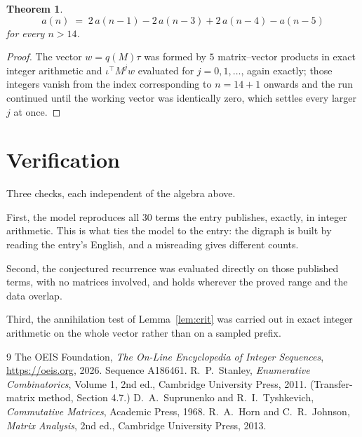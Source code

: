 \documentclass[11pt,a4paper]{article}
\theoremstyle{plain}
\newtheorem{theorem}{Theorem}
\theoremstyle{definition}
\begin{document}
\begin{theorem}
\[
a(n)\;=\;2\,a(n-1) - 2\,a(n-3) + 2\,a(n-4) - a(n-5)
\]
for every $n>14$.
\end{theorem}

\begin{proof}
The vector $w=q(M)\tau$ was formed by $5$ matrix--vector products in exact integer
arithmetic and $\iota^{\!\top}M^{j}w$ evaluated for $j=0,1,\dots$, again exactly; those
integers vanish from the index corresponding to $n=14+1$ onwards and the run continued
until the working vector was identically zero, which settles every larger $j$ at once.
\end{proof}

\section{Verification}

Three checks, each independent of the algebra above.

First, the model reproduces all $30$ terms the entry publishes, exactly, in integer
arithmetic. This is what ties the model to the entry: the digraph is built by reading the
entry's English, and a misreading gives different counts.

Second, the conjectured recurrence was evaluated directly on those published terms, with no
matrices involved, and holds wherever the proved range and the data overlap.

Third, the annihilation test of Lemma~\ref{lem:crit} was carried out in exact integer
arithmetic on the whole vector rather than on a sampled prefix.

\begin{thebibliography}{9}
 The OEIS Foundation, \emph{The On-Line Encyclopedia of Integer
Sequences}, \url{https://oeis.org}, 2026. Sequence A186461.
 R.~P.~Stanley, \emph{Enumerative Combinatorics}, Volume 1, 2nd ed.,
Cambridge University Press, 2011. (Transfer-matrix method, Section 4.7.)
 D.~A.~Suprunenko and R.~I.~Tyshkevich, \emph{Commutative Matrices},
Academic Press, 1968.
 R.~A.~Horn and C.~R.~Johnson, \emph{Matrix Analysis}, 2nd ed., Cambridge
University Press, 2013.
\end{thebibliography}
\end{document}
